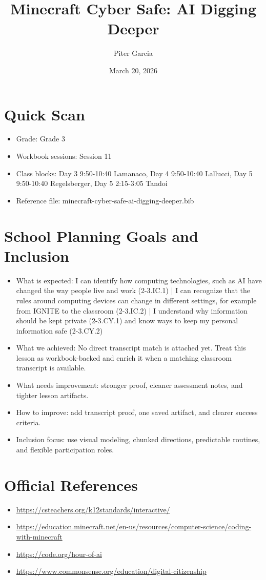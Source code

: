 \documentclass[11pt]{article}
\title{Minecraft Cyber Safe: AI Digging Deeper}
\author{Piter Garcia}
\date{March 20, 2026}
\begin{document}
    \maketitle
    \section*{Quick Scan}
    \begin{itemize}[leftmargin=*]
    \item Grade: Grade 3
    \item Workbook sessions: Session 11
    \item Class blocks: Day 3 9:50-10:40 Lamanaco, Day 4 9:50-10:40 Lallucci, Day 5 9:50-10:40 Regelsberger, Day 5 2:15-3:05 Tandoi
    \item Reference file: minecraft-cyber-safe-ai-digging-deeper.bib
    \end{itemize}
    \section*{School Planning Goals and Inclusion}
    \begin{itemize}[leftmargin=*]
    \item What is expected: I can identify how computing technologies, such as AI have changed the way people live and work (2-3.IC.1) | I can recognize that the rules around computing devices can change in different settings, for example from IGNITE to the classroom (2-3.IC.2) | I understand why information should be kept private (2-3.CY.1) and know ways to keep my personal information safe (2-3.CY.2)
    \item What we achieved: No direct transcript match is attached yet. Treat this lesson as workbook-backed and enrich it when a matching classroom transcript is available.
    \item What needs improvement: stronger proof, cleaner assessment notes, and tighter lesson artifacts.
    \item How to improve: add transcript proof, one saved artifact, and clearer success criteria.
    \item Inclusion focus: use visual modeling, chunked directions, predictable routines, and flexible participation roles.
    \end{itemize}
    \section*{Official References}
    \begin{itemize}[leftmargin=*]
    \item \url{https://csteachers.org/k12standards/interactive/}
\item \url{https://education.minecraft.net/en-us/resources/computer-science/coding-with-minecraft}
\item \url{https://code.org/hour-of-ai}
\item \url{https://www.commonsense.org/education/digital-citizenship}

    \end{itemize}
    
\end{document}
